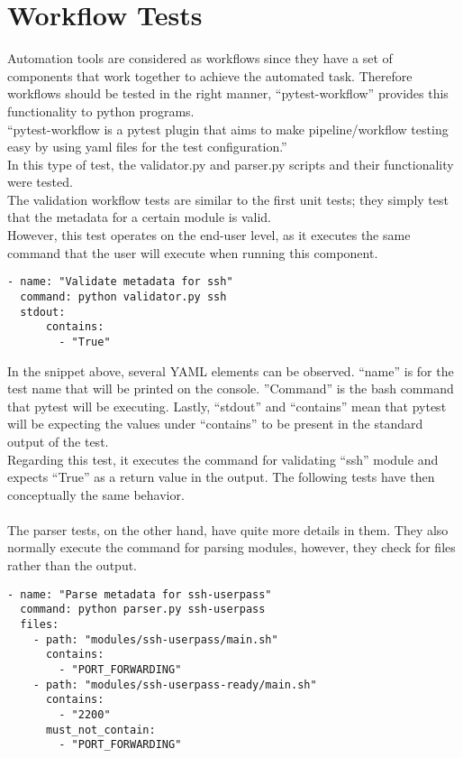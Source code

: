 \section{Workflow Tests}
Automation tools are considered as workflows since they have a set of components that work together to achieve the automated task. Therefore workflows should be tested in the right manner, “pytest-workflow” provides this functionality to python programs.\\
“pytest-workflow is a pytest plugin that aims to make pipeline/workflow testing easy by using yaml files for the test configuration.”\cite{pytestworkflow}\\
In this type of test, the validator.py and parser.py scripts and their functionality were tested.\\
The validation workflow tests are similar to the first unit tests; they simply test that the metadata for a certain module is valid.\\
However, this test operates on the end-user level, as it executes the same command that the user will execute when running this component.
\\
\begin{lstlisting}[caption=test\_validator\_ssh, style=pythonstyle]
- name: "Validate metadata for ssh"
  command: python validator.py ssh
  stdout:
      contains:
        - "True"
\end{lstlisting}

In the snippet above, several YAML elements can be observed. “name” is for the test name that will be printed on the console. ”Command” is the bash command that pytest will be executing. Lastly, “stdout” and “contains” mean that pytest will be expecting the values under “contains” to be present in the standard output of the test.\\
Regarding this test, it executes the command for validating “ssh” module and expects “True” as a return value in the output. The following tests have then conceptually the same behavior.\\
\\
The parser tests, on the other hand, have quite more details in them. They also normally execute the command for parsing modules, however, they check for files rather than the output.

\begin{lstlisting}[caption=test\_parser\_ssh-userpass, style=pythonstyle]
- name: "Parse metadata for ssh-userpass"
  command: python parser.py ssh-userpass
  files:
    - path: "modules/ssh-userpass/main.sh"
      contains:
        - "PORT_FORWARDING"
    - path: "modules/ssh-userpass-ready/main.sh"
      contains:
        - "2200"
      must_not_contain:
        - "PORT_FORWARDING"
\end{lstlisting}

